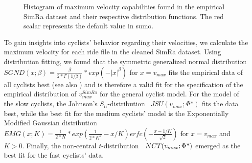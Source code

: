 \begin{figure}
    \centering
    \hfill
    \caption{%
        Histogram of maximum velocity capabilities found in the empirical SimRa dataset and their respective distribution functions.
        The red scalar represents the default value in \ac{sumo}.
    }%
    \label{fig:analysis_max_velo_dist_fit}
    \vspace{-.5em}
\end{figure}

To gain insights into cyclists' behavior regarding their velocities, we calculate the maximum velocity for each ride file in the cleaned SimRa dataset.
Using distribution fitting, we found that the symmetric generalized normal distribution~\cite{nadarajah2005generalized} $SGND(x;\beta) = \frac{\beta}{2*\Gamma(1/\beta)}*exp(-|x|^\beta)$ for $x=v_{max}$ fits the empirical data of all cyclists best (see also ) and is therefore a valid fit for the specification of the empirical distribution of $v_{max}^{SimRa}$ for the general cyclist model.
For the model of the slow cyclists, the Johnson's $S_{U}$-distribution~\cite{johnson1949systems} $JSU(v_{max}; \Phi\mbox{*})$ fits the data best, while the best fit for the medium cyclists' model is the Exponentially Modified Gaussian distribution~\cite{grushka1972characterization} $EMG(x; K) = \frac{1}{2*K}*exp(\frac{1}{2*K^2}-x/K)erfc(-\frac{x-1/K}{\sqrt{2}})$ for $x = v_{max}$ and $K>0$.
Finally, the non-central $t$-distribution~\cite{hogben1961moments} $NCT\newline(v_{max}; \Phi\mbox{*})$ emerged as the best fit for the fast cyclists' data.

